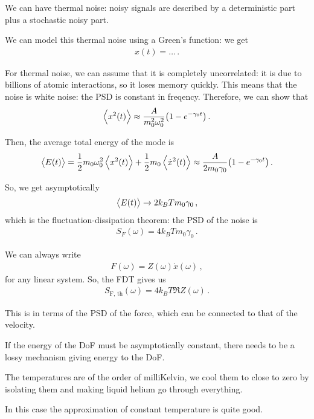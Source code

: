 \documentclass[main.tex]{subfiles}
\begin{document}
We can have thermal noise: noisy signals are described by a deterministic part plus a stochastic noisy part.

We can model this thermal noise using a Green's function: we get 
%
\begin{align}
x(t) = \dots
\,.
\end{align}

For thermal noise, we can assume that it is completely uncorrelated: it is due to billions of atomic interactions, so it loses memory quickly.
This means that the noise is white noise: the PSD is constant in freqency. Therefore, we can show that 
%
\begin{align}
\expval{x^2(t)} \approx \frac{A}{m_0^2 \omega_0^2} \qty(1 - e^{- \gamma_0 t})
\,.
\end{align}

Then, the average total energy of the mode is 
%
\begin{align}
\expval{E(t)} 
= \frac{1}{2} m_0 \omega_0^2 \expval{x^2(t)} + \frac{1}{2} m_0 \expval{\dot{x}^2(t)}
\approx \frac{A}{2 m_0 \gamma_0 } \qty(1 - e^{-\gamma_0 t})
\,.
\end{align}

So, we get asymptotically 
%
\begin{align}
\expval{E(t)} \to 2 k_B T m_0 \gamma_0 
\,,
\end{align}
%
which is the fluctuation-dissipation theorem: the PSD of the noise is 
%
\begin{align}
S_F(\omega ) = 4 k_B T m_0 \gamma_0 
\,.
\end{align}

We can always write 
%
\begin{align}
F(\omega ) = Z(\omega ) \dot{x}(\omega )
\,,
\end{align}
%
for any linear system.
So, the FDT gives us 
%
\begin{align}
S _{\text{F, th}} (\omega ) = 4 k_B T \Re{Z(\omega )}
\,.
\end{align}

This is in terms of the PSD of the force, which can be connected to that of the velocity.

If the energy of the DoF must be asymptotically constant, there needs to be a lossy mechanism giving energy to the DoF. 


The temperatures are of the order of milliKelvin, we cool them to close to zero by isolating them and making liquid helium go through everything. 

In this case the approximation of constant temperature is quite good.
\end{document}

